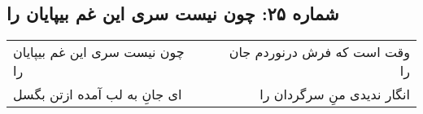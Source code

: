 \begin{center}
\section*{شماره ۲۵: چون نیست سری این غم بیپایان را}
\label{sec:025}
\begin{longtable}{l p{0.5cm} r}
چون نیست سری این غم بیپایان را
&&
وقت است که فرش درنوردم جان را
\\
ای جانِ به لب آمده ازتن بگسل
&&
انگار ندیدی منِ سرگردان را
\\
\end{longtable}
\end{center}
